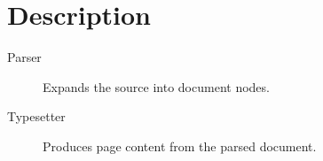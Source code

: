 \documentclass{article}
\begin{document}
\section{Description}
\begin{description}
\item[Parser] Expands the source into document nodes.
\item[Typesetter] Produces page content from the parsed document.
\end{description}
\end{document}
